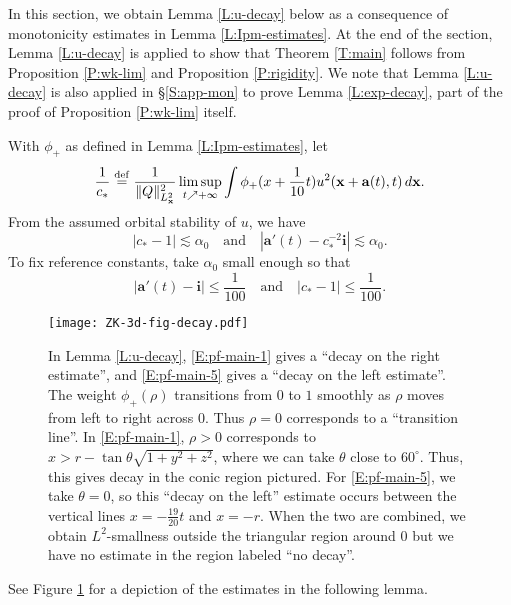 \documentclass[12pt,letterpaper]{amsart}
\newcommand{\defeq}{\stackrel{\rm{def}}{=}}
\theoremstyle{remark}
\numberwithin{equation}{section}
\numberwithin{theorem}{section}
\numberwithin{table}{section}
\begin{document}
In this section, we obtain Lemma \ref{L:u-decay} below as a consequence of monotonicity estimates in Lemma \ref{L:Ipm-estimates}.  At the end of the section, Lemma \ref{L:u-decay} is applied to show that Theorem \ref{T:main} follows from Proposition \ref{P:wk-lim} and Proposition \ref{P:rigidity}.  We note that Lemma \ref{L:u-decay} is also applied in \S\ref{S:app-mon} to prove Lemma \ref{L:exp-decay}, part of the proof of Proposition \ref{P:wk-lim} itself.

With $\phi_+$ as defined in Lemma \ref{L:Ipm-estimates}, let
\begin{equation}
\label{E:pf-main-3}
\frac{1}{c_*} \defeq \frac{1}{\|Q\|_{L_{\mathbf{x}}^2}^2} \limsup_{t\nearrow +\infty} \int \phi_+(x  + \frac1{10}t) u^2(\mathbf{x}+ \mathbf{a}(t),t) \, d\mathbf{x}.
\end{equation}
From the assumed orbital stability of $u$, we have
$$
|c_*-1| \lesssim \alpha_0 \quad \mbox{and} \quad |\mathbf{a}'(t) - c_*^{-2} \mathbf{i}| \lesssim \alpha_0.
$$
To fix reference constants, take $\alpha_0$ small enough so that 
$$
| \mathbf{a}'(t) - \mathbf{i} | \leq \frac{1}{100} \quad \mbox{and} \quad |c_*-1| \leq \frac{1}{100}.
$$

\begin{figure}
\begin{center}\texttt{[image: ZK-3d-fig-decay.pdf]}\end{center}
\caption{\label{F:decay}In Lemma \ref{L:u-decay}, \eqref{E:pf-main-1} gives a ``decay on the right estimate'', and \eqref{E:pf-main-5} gives a ``decay on the left estimate''.  The weight $\phi_+(\rho)$ transitions from $0$ to $1$ smoothly as $\rho$ moves from left to right across $0$.  Thus $\rho=0$ corresponds to a ``transition line''.  In \eqref{E:pf-main-1}, $\rho>0$ corresponds to $x>r-\tan \theta \sqrt{1+y^2+z^2}$, where we can take $\theta$ close to $60^\circ$.  Thus, this gives decay in the conic region pictured.  For \eqref{E:pf-main-5}, we take $\theta=0$, so this ``decay on the left'' estimate occurs between the vertical lines $x=-\frac{19}{20}t$ and $x=-r$.  When the two are combined, we obtain $L^2$-smallness outside the triangular region around $0$ but we have no estimate in the region labeled ``no decay''.}
\end{figure}

See Figure \ref{F:decay} for a depiction of the estimates in the following lemma.
\end{document}
